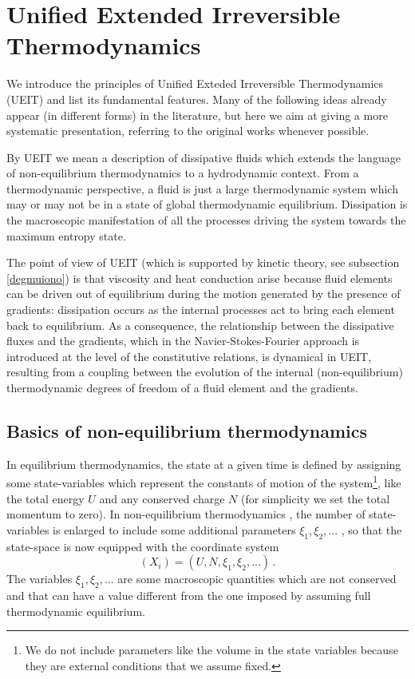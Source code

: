 \documentclass[a4paper, amsfonts, amssymb, amsmath, reprint, twocolumn, showkeys, nofootinbib]{revtex4-2}
\begin{document}

\section{Unified Extended Irreversible Thermodynamics}

We introduce the principles of Unified Exteded Irreversible Thermodynamics (UEIT) and list its fundamental features. Many of the following ideas already appear (in different forms) in the literature, but here we aim at giving a more systematic presentation, referring to the original works whenever possible.

By UEIT we mean a description of dissipative fluids which extends the language of non-equilibrium thermodynamics to a hydrodynamic context. From a thermodynamic perspective, a fluid is just a large thermodynamic system which may or may not be in a state of global thermodynamic equilibrium. Dissipation is the macroscopic manifestation of all the processes driving the system towards the maximum entropy state. 

The point of view of UEIT (which is supported by kinetic theory, see subsection \ref{degmuiono}) is that viscosity and heat conduction arise because fluid elements can be driven out of equilibrium during the motion generated by the presence of gradients: dissipation occurs as the internal processes act to bring each element back to equilibrium. As a consequence, the relationship between the dissipative fluxes and the gradients, which in the Navier-Stokes-Fourier approach is introduced at the level of the constitutive relations, is dynamical in UEIT, resulting from a coupling between the evolution of the internal (non-equilibrium) thermodynamic degrees of freedom of a fluid element and the gradients.
  
\subsection{Basics of non-equilibrium thermodynamics}
\label{basilKs}

In equilibrium thermodynamics, the state at a given time is defined by assigning some state-variables which represent the constants of motion of the system\footnote{
We do not include parameters like the volume in the state variables because they are external conditions that we assume fixed.}, 
like the total energy $U$ and any conserved charge $N$ (for simplicity we set the total momentum to zero). In non-equilibrium thermodynamics \citep{prigoginebook}, the number of state-variables is enlarged to include some additional parameters $\xi_1,\xi_2,...$ , so that the state-space is now equipped with the coordinate system
\begin{equation}\label{hikpfijmv}
(X_i) = (U,N,\xi_1,\xi_2,...) \, .
\end{equation}  
The variables $\xi_1,\xi_2,...$ are some macroscopic quantities which are not conserved and that can have a  value different from the one imposed by assuming full thermodynamic equilibrium.
\end{document}

